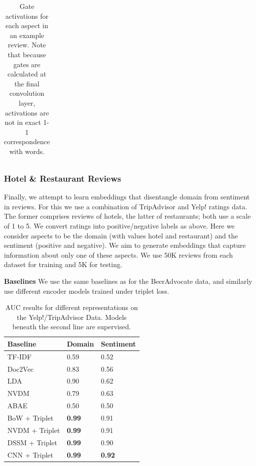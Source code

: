 \documentclass[11pt,a4paper]{article}
\begin{document}
\begin{table}
\begin{tabularx}{\textwidth}{X|X|X|X}
\end{tabularx}
\vspace{-.75em}
\caption{Gate activations for each aspect in an example review. Note that because gates are calculated at the final convolution layer, activations are not in exact 1-1 correspondence with words.}
\label{table:beer-example}
\vspace{-.75em}
\end{table} 

\vspace{-.3em}
\subsubsection{Hotel \& Restaurant Reviews}
\vspace{-.25em}

Finally, we attempt to learn embeddings that disentangle domain from sentiment in reviews. For this we use a combination of TripAdvisor and Yelp! ratings data. The former comprises reviews of hotels, the latter of restaurants; both use a scale of 1 to 5. We convert ratings into positive/negative labels as above. Here we consider aspects to be the domain (with values hotel and restaurant) and the sentiment (positive and negative). We aim to generate embeddings that capture information about only one of these aspects. We use 50K reviews from each dataset for training and 5K for testing. 

\vspace{.2em}
\noindent \textbf{Baselines} We use the same baselines as for the BeerAdvocate data, and similarly use different encoder models trained under triplet loss.

\begin{table}
\footnotesize
    \centering
    \begin{tabularx}{\columnwidth}{l X X}
     Baseline & Domain & Sentiment  \\
    \hline
    TF-IDF & 0.59 & 0.52   \\
    Doc2Vec & 0.83 & 0.56 \\
    LDA & 0.90 & 0.62 \\
    NVDM & 0.79 & 0.63  \\
    ABAE & 0.50 & 0.50 \\
    \hline
    BoW + Triplet & \textbf{0.99} & 0.91 \\
    NVDM + Triplet & \textbf{0.99} & 0.91 \\
    DSSM + Triplet &  \textbf{0.99} & 0.90 \\
    CNN + Triplet & \textbf{0.99} & \textbf{0.92}  \\
    \end{tabularx}
    \vspace{-1em}
    \caption{AUC results for different representations on the Yelp!/TripAdvisor Data. Models beneath the second line are supervised.}
    \vspace{-.35em}
    \label{table:foodauc}
\end{table}
\end{document}
